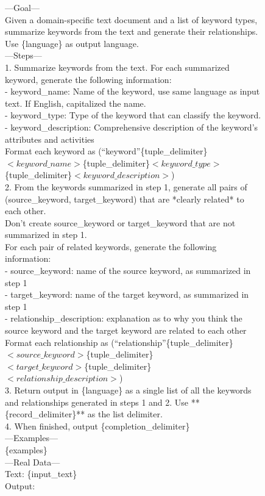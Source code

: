 \documentclass[11pt]{article}
\begin{document}
\begin{figure}[h]
\centering
\small
\begin{tcolorbox}[title=Prompt of object tag keyword extraction, colframe=gray, colback=white]
    ---Goal--- \\
    Given a domain-specific text document and a list of keyword types, summarize keywords from the text and generate their relationships.
    Use \{language\} as output language. \\
    ---Steps--- \\
    1. Summarize keywords from the text. For each summarized keyword, generate the following information: \\
    - keyword\_name: Name of the keyword, use same language as input text. If English, capitalized the name. \\
    - keyword\_type: Type of the keyword that can classify the keyword. \\
    - keyword\_description: Comprehensive description of the keyword's attributes and activities \\
    Format each keyword as (``keyword''\{tuple\_delimiter\}$<keyword\_name>$\{tuple\_delimiter\}$<keyword\_type>$ \\
    \{tuple\_delimiter\}$<keyword\_description>$) \\
    2. From the keywords summarized in step 1, generate all pairs of (source\_keyword, target\_keyword) that are *clearly related* to each other.  \\
    Don't create source\_keyword or target\_keyword that are not summarized in step 1. \\
    For each pair of related keywords, generate the following information: \\
    - source\_keyword: name of the source keyword, as summarized in step 1 \\
    - target\_keyword: name of the target keyword, as summarized in step 1 \\
    - relationship\_description: explanation as to why you think the source keyword and the target keyword are related to each other \\
    Format each relationship as (``relationship''\{tuple\_delimiter\}$<source\_keyword>$\{tuple\_delimiter\} \\
    $<target\_keyword>$\{tuple\_delimiter\}$<relationship\_description>$) \\
    3. Return output in \{language\} as a single list of all the keywords and relationships generated in steps 1 and 2. Use **\{record\_delimiter\}** as the list delimiter. \\
    4. When finished, output \{completion\_delimiter\} \\
    
    ---Examples--- \\
    \{examples\} \\
    ---Real Data--- \\
    Text: \{input\_text\} \\
    Output:
\end{tcolorbox}
\end{figure}
\end{document}
